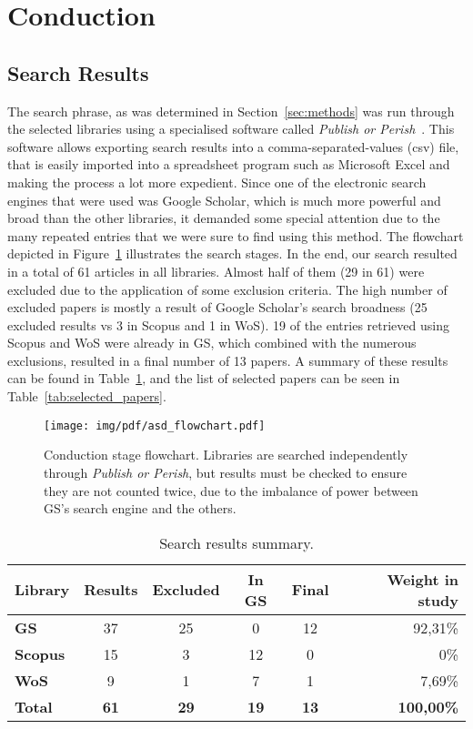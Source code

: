 \section{Conduction}
\label{sec:conduction}
\subsection{Search Results}
\label{sub:the_search}

The search phrase, as was determined in Section~\ref{sec:methods} was
run through the selected libraries using a specialised software called
\emph{Publish or Perish}~\cite{Harzing}. This software allows exporting
search results into a comma-separated-values (csv) file, that is easily
imported into a spreadsheet program such as Microsoft Excel and making
the process a lot more expedient. Since one of the electronic search
engines that were used was Google Scholar, which is much more powerful
and broad than the other libraries, it demanded some special attention
due to the many repeated entries that we were sure to find using this
method. The flowchart depicted in Figure~\ref{fig:flowchart} illustrates
the search stages. In the end, our search resulted in a total of 61
articles in all libraries. Almost half of them (29 in 61) were excluded
due to the application of some exclusion criteria. The high number of
excluded papers is mostly a result of Google Scholar's search broadness
(25 excluded results vs 3 in Scopus and 1 in WoS). 19 of the entries
retrieved using Scopus and WoS were already in GS, which combined with
the numerous exclusions, resulted in a final number of 13 papers. A
summary of these results can be found in Table~\ref{tab:search_results},
and the list of selected papers can be seen in
Table~\ref{tab:selected_papers}.

\begin{figure}[htpb]
    \centering
    \texttt{[image: img/pdf/asd\_flowchart.pdf]}
    \caption{Conduction stage flowchart. Libraries are searched
    independently through \emph{Publish or Perish}, but results must be
    checked to ensure they are not counted twice, due to the imbalance of
    power between GS's search engine and the others.}
    \label{fig:flowchart}
\end{figure}

\begin{table}[htb]
\centering
\caption{Search results summary.}
\label{tab:search_results}
\begin{tabular}{@{}lccccr@{}}
\toprule
\textbf{Library} & \textbf{Results} & \textbf{Excluded} & \textbf{In GS} & \textbf{Final} & \textbf{Weight in study} \\ \midrule
\textbf{GS} & 37 & 25 & 0 & 12 & 92,31\% \\
\textbf{Scopus} & 15 & 3 & 12 & 0 & 0\% \\
\textbf{WoS} & 9 & 1 & 7 & 1 & 7,69\% \\
\midrule
\textbf{Total}& \textbf{61} & \textbf{29} & \textbf{19} &\textbf{13} & \textbf{100,00\%} \\ \bottomrule
\end{tabular}
\end{table}


